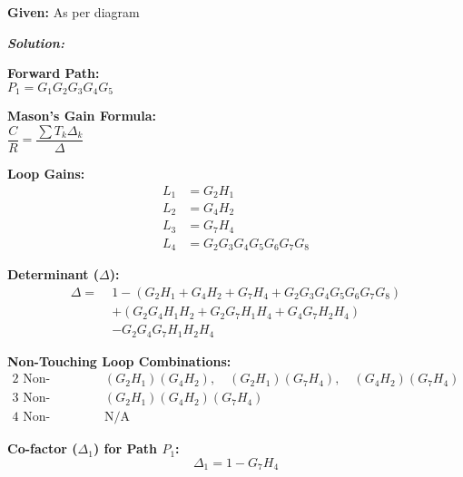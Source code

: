 \documentclass[11pt,letterpaper]{article}
\begin{document}
\noindent\textbf{Given:} As per diagram

\vspace{12pt}
\noindent\textit{\textbf{Solution:}}

\begin{center}
\vspace{6pt}

\noindent \textbf{Forward Path:} \\
$P_1 = G_1G_2G_3G_4G_5$

\vspace{6pt}

\noindent \textbf{Mason's Gain Formula:} \\
$\dfrac{C}{R} = \dfrac{\sum T_k \Delta_k}{\Delta}$

\vspace{6pt}

\noindent \textbf{Loop Gains:}
\begin{align*}
L_1 &= G_2H_1 \\
L_2 &= G_4H_2 \\
L_3 &= G_7H_4 \\
L_4 &= G_2G_3G_4G_5G_6G_7G_8
\end{align*}

\vspace{6pt}

\noindent \textbf{Determinant ($\Delta$):}
\[
\begin{aligned}
\Delta =\; &1 
- \left(G_2H_1 + G_4H_2 + G_7H_4 + G_2G_3G_4G_5G_6G_7G_8\right) \\
&+ \left(G_2G_4H_1H_2 + G_2G_7H_1H_4 + G_4G_7H_2H_4\right) \\
&- G_2G_4G_7H_1H_2H_4
\end{aligned}
\]


\vspace{6pt}

\noindent \textbf{Non-Touching Loop Combinations:}
\begin{align*}
\text{2 Non-Touching: } & (G_2H_1)(G_4H_2),\quad (G_2H_1)(G_7H_4),\quad (G_4H_2)(G_7H_4) \\
\text{3 Non-Touching: } & (G_2H_1)(G_4H_2)(G_7H_4) \\
\text{4 Non-Touching: } & \text{N/A}
\end{align*}

\vspace{6pt}

\noindent \textbf{Co-factor ($\Delta_1$) for Path $P_1$:}
\[
\Delta_1 = 1 - G_7H_4
\]

\vspace{6pt}


\end{center}
\end{document}

